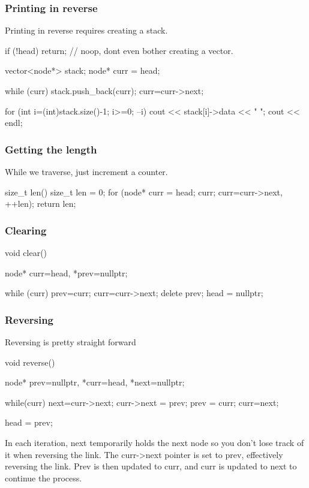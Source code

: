 \documentclass{report}
\begin{document}
    \pagebreak 
    \subsubsection{Printing in reverse}
    \bigbreak \noindent 
    Printing in reverse requires creating a stack.
    \bigbreak \noindent 
    \begin{cppcode}
    if (!head) return; // noop, dont even bother creating a vector.

    vector<node*> stack;
    node* curr = head;

    while (curr) {
        stack.push_back(curr);
        curr=curr->next;
    }

    for (int i=(int)stack.size()-1; i>=0; --i) {
        cout << stack[i]->data << " ";
    }
    cout << endl;
    \end{cppcode}

    \pagebreak 
    \subsubsection{Getting the length}
    \bigbreak \noindent 
    While we traverse, just increment a counter.
    \bigbreak \noindent 
    \begin{cppcode}
        size_t len() {
            size_t len = 0;
            for (node* curr = head; curr; curr=curr->next, ++len);
            return len;
        }
    \end{cppcode}

    \pagebreak 
    \subsubsection{Clearing}
    \bigbreak \noindent 
    \begin{cppcode}
        void clear() {
            node* curr=head, *prev=nullptr;

            while (curr) {
                prev=curr;
                curr=curr->next;
                delete prev;
            }
            head = nullptr;
        }
    \end{cppcode}

    \pagebreak 
    \subsubsection{Reversing}
    \bigbreak \noindent 
    Reversing is pretty straight forward
    \bigbreak \noindent 
    \begin{cppcode}
        void reverse() {
            node* prev=nullptr, *curr=head, *next=nullptr;

            while(curr) {
                next=curr->next;
                curr->next = prev;
                prev = curr;
                curr=next;
            }

            head = prev;
        }
    \end{cppcode}
    \bigbreak \noindent 
    In each iteration, next temporarily holds the next node so you don’t lose track of it when reversing the link.
    \bigbreak \noindent 
    The curr->next pointer is set to prev, effectively reversing the link.
    \bigbreak \noindent 
    Prev is then updated to curr, and curr is updated to next to continue the process.
\end{document}
